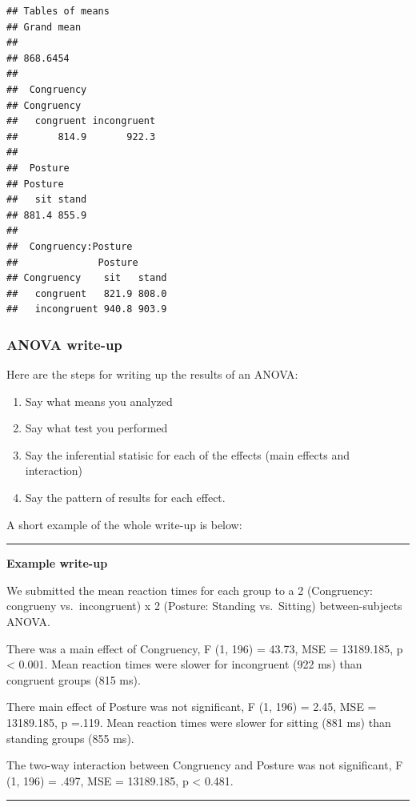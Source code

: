 \documentclass[]{book}
\providecommand{\tightlist}{%
  \setlength{\itemsep}{0pt}\setlength{\parskip}{0pt}}
\theoremstyle{definition}
\theoremstyle{definition}
\theoremstyle{definition}
\theoremstyle{remark}
\begin{document}
\begin{verbatim}
## Tables of means
## Grand mean
##          
## 868.6454 
## 
##  Congruency 
## Congruency
##   congruent incongruent 
##       814.9       922.3 
## 
##  Posture 
## Posture
##   sit stand 
## 881.4 855.9 
## 
##  Congruency:Posture 
##              Posture
## Congruency    sit   stand
##   congruent   821.9 808.0
##   incongruent 940.8 903.9
\end{verbatim}

\subsubsection{ANOVA write-up}\label{anova-write-up}

Here are the steps for writing up the results of an ANOVA:

\begin{enumerate}
\def\labelenumi{\arabic{enumi}.}
\tightlist
\item
  Say what means you analyzed
\item
  Say what test you performed
\item
  Say the inferential statisic for each of the effects (main effects and
  interaction)
\item
  Say the pattern of results for each effect.
\end{enumerate}

A short example of the whole write-up is below:

\begin{center}\rule{0.5\linewidth}{\linethickness}\end{center}

\textbf{Example write-up}

We submitted the mean reaction times for each group to a 2 (Congruency:
congrueny vs.~incongruent) x 2 (Posture: Standing vs.~Sitting)
between-subjects ANOVA.

There was a main effect of Congruency, F (1, 196) = 43.73, MSE =
13189.185, p \textless{} 0.001. Mean reaction times were slower for
incongruent (922 ms) than congruent groups (815 ms).

There main effect of Posture was not significant, F (1, 196) = 2.45, MSE
= 13189.185, p =.119. Mean reaction times were slower for sitting (881
ms) than standing groups (855 ms).

The two-way interaction between Congruency and Posture was not
significant, F (1, 196) = .497, MSE = 13189.185, p \textless{} 0.481.

\begin{center}\rule{0.5\linewidth}{\linethickness}\end{center}
\end{document}
